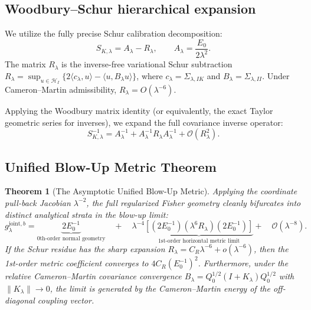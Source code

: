 \documentclass[11pt]{amsart}
\theoremstyle{plain}
\newtheorem{theorem}{Theorem}
\theoremstyle{definition}
\theoremstyle{remark}
\begin{document}
\subsection{Woodbury--Schur hierarchical expansion}

We utilize the fully precise Schur calibration decomposition:
\begin{equation}
  S_{K,\lambda} = A_\lambda - R_\lambda, \qquad A_\lambda = \frac{E_0}{2\lambda^2}.
\end{equation}
The matrix $R_\lambda$ is the inverse-free variational Schur subtraction $R_\lambda = \sup_{u\in\mathcal H_I}\{2\langle c_\lambda,u\rangle-\langle u,B_\lambda u\rangle\}$, where $c_\lambda = \Sigma_{\lambda,IK}$ and $B_\lambda = \Sigma_{\lambda,II}$. Under Cameron--Martin admissibility, $R_\lambda = O(\lambda^{-6})$.

Applying the Woodbury matrix identity (or equivalently, the exact Taylor geometric series for inverses), we expand the full covariance inverse operator:
\begin{equation}
  S_{K,\lambda}^{-1} = A_\lambda^{-1} + A_\lambda^{-1} R_\lambda A_\lambda^{-1} + \mathcal{O}(R_\lambda^2).
\end{equation}

\subsection{Unified Blow-Up Metric Theorem}

\begin{theorem}[The Asymptotic Unified Blow-Up Metric]
\label{thm:unified_blowup_metric}
Applying the coordinate pull-back Jacobian $\lambda^{-2}$, the full regularized Fisher geometry cleanly bifurcates into distinct analytical strata in the blow-up limit:
\begin{equation}
  g_{\lambda}^{\mathrm{joint},b} = \underbrace{2 E_0^{-1}}_{\text{0th-order normal geometry}} \quad + \quad \lambda^{-4} \underbrace{\left[ (2E_0^{-1}) (\lambda^6 R_\lambda) (2E_0^{-1}) \right]}_{\text{1st-order horizontal metric limit}} + \quad \mathcal{O}(\lambda^{-8}).
\end{equation}
If the Schur residue has the sharp expansion $R_\lambda=C_R\lambda^{-6}+o(\lambda^{-6})$, then the 1st-order metric coefficient converges to $4 C_R (E_0^{-1})^2$. Furthermore, under the relative Cameron--Martin covariance convergence $B_\lambda = Q_0^{1/2}(I + K_\lambda)Q_0^{1/2}$ with $\|K_\lambda\| \to 0$, the limit is generated by the Cameron--Martin energy of the off-diagonal coupling vector.
\end{theorem}
\end{document}

